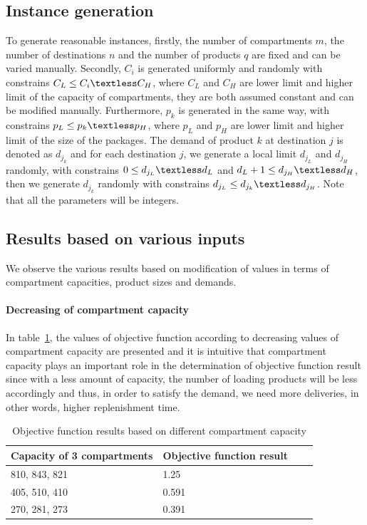 \documentclass{article}
\begin{document}
\subsection{Instance generation}
To generate reasonable instances, firstly, the number of compartments $m$, the number of destinations $n$ and the number of products $q$ are fixed and can be varied manually. Secondly, $C_i$ is generated uniformly and randomly with constrains $C_L \leq C_i \textless C_H$, where $C_L$ and $C_H$ are lower limit and higher limit of the capacity of compartments, they are both assumed constant and can be modified manually. Furthermore, $p_k$ is generated in the same way, with constrains $p_L \leq p_k \textless p_H$, where $p_L$ and $p_H$ are lower limit and higher limit of the size of the packages. The demand of product $k$ at destination $j$ is denoted as $d_{j_k}$ and for each destination $j$, we generate a local limit $d_{j_L}$ and $d_{j_H}$ randomly, with constrains $0 \leq d_{j_L} \textless d_L$ and $d_{L}+1 \leq d_{j_H} \textless d_H$, then we generate $d_{j_k}$ randomly with constrains $d_{j_L} \leq d_{j_k} \textless d_{j_H}$. Note that all the parameters will be integers.

\subsection{Results based on various inputs}
We observe the various results based on modification of values in terms of compartment capacities, product sizes and demands.

\paragraph{Decreasing of compartment capacity}
In table~\ref{tab:capacity variation}, the values of objective function according to decreasing values of compartment capacity are presented and it is intuitive that  compartment capacity plays an important role in the determination of objective function result since with a less amount of capacity, the number of loading products will be less accordingly and thus, in order to satisfy the demand, we need more deliveries, in other words, higher replenishment time. 

\begin{table}[ht]
 \caption{Objective function results based on different compartment capacity}
  \centering
  \begin{tabular}{llll}
    \toprule
    Capacity of 3 compartments   & Objective function result \\
    \midrule
    810, 843, 821	&	1.25	\\
    405, 510, 410	&	0.591	\\
    270, 281, 273	&	0.391	\\
    \bottomrule
  \end{tabular}
  \label{tab:capacity variation}
\end{table}
\end{document}
